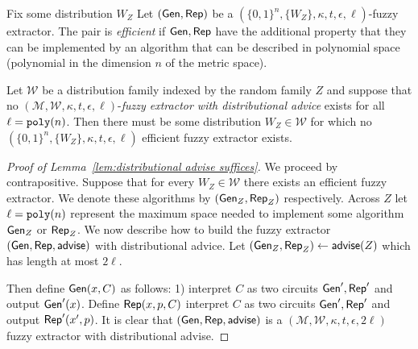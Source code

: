 \begin{definition}
Fix some distribution $W_Z$ Let $({\mathsf{Gen}}, {\mathsf{Rep}})$ be a $(\{0,1\}^n, \{W_Z\}, \kappa, t, \epsilon, \ell)$-fuzzy extractor.  The pair is \emph{efficient} if ${\mathsf{Gen}}, {\mathsf{Rep}}$ have the  additional property that they can be implemented by an algorithm that can be described in polynomial space (polynomial in the dimension $n$ of the metric space).
\end{definition}

\begin{lemma}
Let $\mathcal{W}$ be a distribution family indexed by the random family $Z$ and suppose that no $(\mathcal{M}, \mathcal{W}, \kappa, t, \epsilon, \ell)$-\emph{fuzzy extractor with distributional advice} exists for all $\ell = \mathtt{poly}(n)$.  Then there must be some distribution $W_Z \in \mathcal{W}$ for which no  $(\{0,1\}^n, \{W_Z\}, \kappa, t, \epsilon, \ell)$ efficient fuzzy extractor exists.
\label{lem:distributional advise suffices}
\end{lemma}
\begin{proof}[Proof of Lemma~\ref{lem:distributional advise suffices}]
We proceed by contrapositive.  Suppose that for every $W_Z\in\mathcal{W}$ there exists an efficient fuzzy extractor.  We denote these algorithms by $({\mathsf{Gen}}_Z, {\mathsf{Rep}}_Z)$ respectively.  Across $Z$ let $\ell = \mathtt{poly}(n)$ represent the maximum space needed to implement some algorithm ${\mathsf{Gen}}_Z$ or ${\mathsf{Rep}}_Z$. We now describe how to build the fuzzy extractor $({\mathsf{Gen}}, {\mathsf{Rep}}, {\mathsf{advise}})$ with distributional advice.  Let $({\mathsf{Gen}}_Z, {\mathsf{Rep}}_Z) \leftarrow {\ensuremath{\mathsf{advise}}}(Z)$ which has length at most $2\ell$.

Then define ${\mathsf{Gen}}(x, C)$ as follows: 1) interpret $C$ as two circuits ${\mathsf{Gen}}', {\mathsf{Rep}}'$ and output ${\mathsf{Gen}}'(x)$.  Define ${\mathsf{Rep}}(x, p, C)$ interpret $C$ as two circuits ${\mathsf{Gen}}', {\mathsf{Rep}}'$ and output ${\mathsf{Rep}}'(x', p)$.  It is clear that $({\mathsf{Gen}}, {\mathsf{Rep}}, {\mathsf{advise}})$ is a $(\mathcal{M}, \mathcal{W}, \kappa, t, \epsilon, 2\ell)$ fuzzy extractor with distributional advise.
\end{proof}


